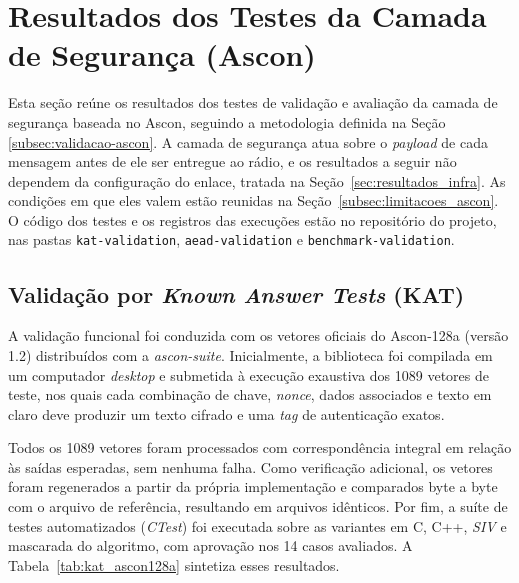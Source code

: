 \section{Resultados dos Testes da Camada de Segurança (Ascon)}
\label{sec:resultados_ascon}

Esta seção reúne os resultados dos testes de validação e avaliação da camada de segurança baseada no Ascon, seguindo a metodologia definida na Seção \ref{subsec:validacao-ascon}. A camada de segurança atua sobre o \textit{payload} de cada mensagem antes de ele ser entregue ao rádio, e os resultados a seguir não dependem da configuração do enlace, tratada na Seção~\ref{sec:resultados_infra}. As condições em que eles valem estão reunidas na Seção~\ref{subsec:limitacoes_ascon}. O código dos testes e os registros das execuções estão no repositório do projeto, nas pastas \texttt{kat-validation}, \texttt{aead-validation} e \texttt{benchmark-validation}.


\subsection{Validação por \textit{Known Answer Tests} (KAT)}
\label{subsec:kat_resultados}

A validação funcional foi conduzida com os vetores oficiais do Ascon-128a (versão 1.2) distribuídos com a \textit{ascon-suite}. Inicialmente, a biblioteca foi compilada em um computador \textit{desktop} e submetida à execução exaustiva dos 1089 vetores de teste, nos quais cada combinação de chave, \textit{nonce}, dados associados e texto em claro deve produzir um texto cifrado e uma \textit{tag} de autenticação exatos.

Todos os 1089 vetores foram processados com correspondência integral em relação às saídas esperadas, sem nenhuma falha. Como verificação adicional, os vetores foram regenerados a partir da própria implementação e comparados byte a byte com o arquivo de referência, resultando em arquivos idênticos. Por fim, a suíte de testes automatizados (\textit{CTest}) foi executada sobre as variantes em C, C++, \textit{SIV} e mascarada do algoritmo, com aprovação nos 14 casos avaliados. A Tabela~\ref{tab:kat_ascon128a} sintetiza esses resultados.

